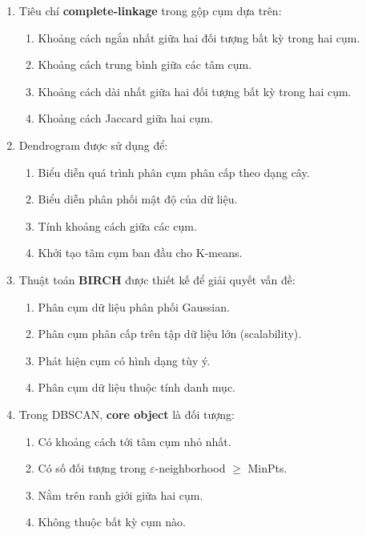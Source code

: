 \documentclass[10pt]{article}
\begin{document}
\begin{enumerate}[leftmargin=*, label=\textbf{Câu \arabic*.}]
    \item Tiêu chí \textbf{complete-linkage} trong gộp cụm dựa trên:
    \begin{enumerate}[label=\Alph*.]
        \item Khoảng cách ngắn nhất giữa hai đối tượng bất kỳ trong hai cụm.
        \item Khoảng cách trung bình giữa các tâm cụm.
        \item Khoảng cách dài nhất giữa hai đối tượng bất kỳ trong hai cụm.
        \item Khoảng cách Jaccard giữa hai cụm.
    \end{enumerate}

    \item Dendrogram được sử dụng để:
    \begin{enumerate}[label=\Alph*.]
        \item Biểu diễn quá trình phân cụm phân cấp theo dạng cây.
        \item Biểu diễn phân phối mật độ của dữ liệu.
        \item Tính khoảng cách giữa các cụm.
        \item Khởi tạo tâm cụm ban đầu cho K-means.
    \end{enumerate}

    \item Thuật toán \textbf{BIRCH} được thiết kế để giải quyết vấn đề:
    \begin{enumerate}[label=\Alph*.]
        \item Phân cụm dữ liệu phân phối Gaussian.
        \item Phân cụm phân cấp trên tập dữ liệu lớn (scalability).
        \item Phát hiện cụm có hình dạng tùy ý.
        \item Phân cụm dữ liệu thuộc tính danh mục.
    \end{enumerate}

    \item Trong DBSCAN, \textbf{core object} là đối tượng:
    \begin{enumerate}[label=\Alph*.]
        \item Có khoảng cách tới tâm cụm nhỏ nhất.
        \item Có số đối tượng trong $\varepsilon$-neighborhood $\geq$ MinPts.
        \item Nằm trên ranh giới giữa hai cụm.
        \item Không thuộc bất kỳ cụm nào.
    \end{enumerate}


\end{enumerate}
\end{document}
